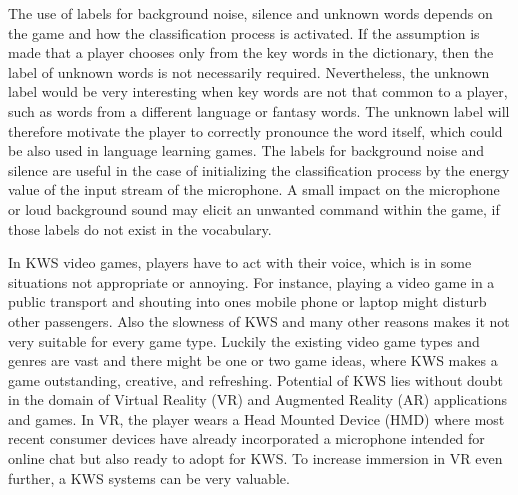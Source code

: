 The use of labels for background noise, silence and unknown words depends on the game and how the classification process is activated.
If the assumption is made that a player chooses only from the key words in the dictionary, then the label of unknown words is not necessarily required.
Nevertheless, the unknown label would be very interesting when key words are not that common to a player, such as words from a different language or fantasy words.
The unknown label will therefore motivate the player to correctly pronounce the word itself, which could be also used in language learning games.
The labels for background noise and silence are useful in the case of initializing the classification process by the energy value of the input stream of the microphone.
A small impact on the microphone or loud background sound may elicit an unwanted command within the game, if those labels do not exist in the vocabulary.

In KWS video games, players have to act with their voice, which is in some situations not appropriate or annoying.
For instance, playing a video game in a public transport and shouting into ones mobile phone or laptop might disturb other passengers.
Also the slowness of KWS and many other reasons makes it not very suitable for every game type.
Luckily the existing video game types and genres are vast and there might be one or two game ideas, where KWS makes a game outstanding, creative, and refreshing.
Potential of KWS lies without doubt in the domain of Virtual Reality (VR) and Augmented Reality (AR) applications and games.
In VR, the player wears a Head Mounted Device (HMD) where most recent consumer devices have already incorporated a microphone intended for online chat but also ready to adopt for KWS.
To increase immersion in VR even further, a KWS systems can be very valuable.